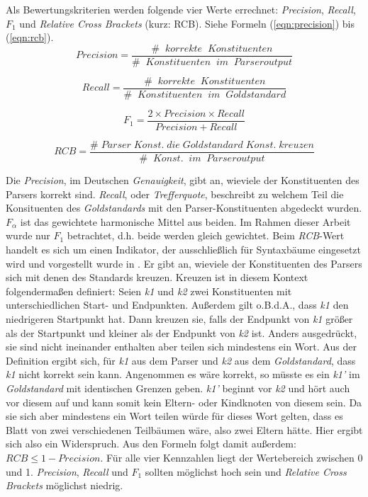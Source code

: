 Als Bewertungskriterien werden folgende vier Werte errechnet: \textit{Precision}, \textit{Recall}, \(F_1\) und \textit{Relative Cross Brackets} (kurz: RCB). Siehe Formeln (\ref{eqn:precision}) bis (\ref{eqn:rcb}). \\ 
\begin{equation}
Precision = \frac{\# \;\; korrekte \;\; Konstituenten}{ \# \;\; Konstituenten \;\; im \;\; Parseroutput}
\label{eqn:precision}
\end{equation}

\begin{equation}
Recall = \frac{\# \;\; korrekte \;\; Konstituenten}{ \# \;\; Konstituenten \;\; im \;\; Goldstandard}
\end{equation}

\begin{equation}
F_1 = \frac{2 \times Precision \times Recall}{ Precision + Recall}
\end{equation}

\begin{equation}
RCB = \frac{\# \; Parser \; Konst. \; die \; Goldstandard \; Konst. \; kreuzen}{ \# \;\; Konst. \;\; im \;\; Parseroutput}
\label{eqn:rcb}
\end{equation}

Die \textit{Precision}, im Deutschen \textit{Genauigkeit}, gibt an, wieviele der Konstituenten des Parsers korrekt sind. \textit{Recall}, oder \textit{Trefferquote}, beschreibt zu welchem Teil die Konsituenten des \textit{Goldstandards} mit den Parser-Konstituenten abgedeckt wurden. \(F_\alpha\) ist das gewichtete harmonische Mittel aus beiden. Im Rahmen dieser Arbeit wurde nur \(F_1\) betrachtet, d.h. beide werden gleich gewichtet. Beim \textit{RCB}-Wert handelt es sich um einen Indikator, der ausschließlich für Syntaxbäume eingesetzt wird und vorgestellt wurde in \cite{crossbrackets}. Er gibt an, wieviele der Konstituenten des Parsers sich mit denen des Standards kreuzen. Kreuzen ist in diesem Kontext folgendermaßen definiert: Seien \textit{k1} und \textit{k2} zwei Konstituenten mit unterschiedlichen Start- und Endpunkten. Außerdem gilt o.B.d.A., dass \textit{k1} den niedrigeren Startpunkt hat. Dann kreuzen sie, falls der Endpunkt von \textit{k1} größer als der Startpunkt und kleiner als der Endpunkt von \textit{k2} ist. Anders ausgedrückt, sie sind nicht ineinander enthalten aber teilen sich mindestens ein Wort. %
Aus der Definition ergibt sich, für \textit{k1} aus dem Parser und \textit{k2} aus dem \textit{Goldstandard}, dass \textit{k1} nicht korrekt sein kann. Angenommen es wäre korrekt, so müsste es ein \textit{k1'} im \textit{Goldstandard} mit identischen Grenzen geben. \textit{k1'} beginnt vor \textit{k2} und hört auch vor diesem auf und kann somit kein Eltern- oder Kindknoten von diesem sein. Da sie sich aber mindestens ein Wort teilen würde für dieses Wort gelten, dass es Blatt von zwei verschiedenen Teilbäumen wäre, also zwei Eltern hätte. Hier ergibt sich also ein Widerspruch. Aus den Formeln folgt damit außerdem: \( RCB \leq 1 - Precision \). Für alle vier Kennzahlen liegt der Wertebereich zwischen 0 und 1. \textit{Precision}, \textit{Recall} und \(F_1\) sollten möglichst hoch sein und \textit{Relative Cross Brackets} möglichst niedrig.